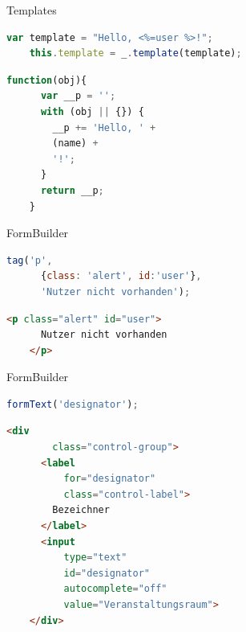 
\begin{frame}[fragile]{Templates}
  \begin{lstlisting}[language=JavaScript,gobble=4]
    var template = "Hello, <%=user %>!";
    this.template = _.template(template);
  \end{lstlisting}
  
  \begin{lstlisting}[language=JavaScript,gobble=4]
    function(obj){
      var __p = '';
      with (obj || {}) {
        __p += 'Hello, ' +
        (name) +
        '!';
      }
      return __p;
    }
  \end{lstlisting}
\end{frame}

\begin{frame}[fragile]{FormBuilder}
  \begin{lstlisting}[language=JavaScript,gobble=4]
    tag('p',
      {class: 'alert', id:'user'},
      'Nutzer nicht vorhanden');
  \end{lstlisting}
  \begin{lstlisting}[language=HTML,gobble=4]
    <p class="alert" id="user">
      Nutzer nicht vorhanden
    </p>
  \end{lstlisting}
\end{frame}

\begin{frame}[fragile]{FormBuilder}
  \begin{lstlisting}[language=JavaScript,gobble=4]
    formText('designator');
  \end{lstlisting}
  \begin{lstlisting}[language=HTML,gobble=4]
    <div
        class="control-group">
      <label
          for="designator"
          class="control-label">
        Bezeichner
      </label>
      <input
          type="text"
          id="designator"
          autocomplete="off"
          value="Veranstaltungsraum">
    </div>
  \end{lstlisting}
\end{frame}


